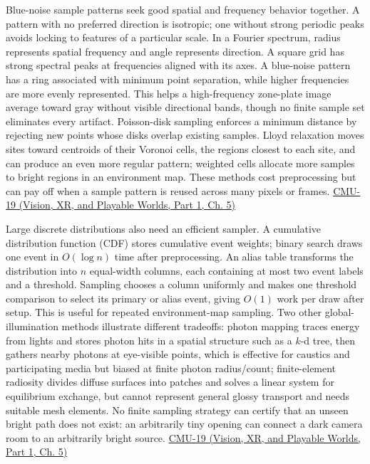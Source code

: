 Blue-noise sample patterns seek good spatial and frequency behavior together. A pattern with no preferred direction is isotropic; one without strong periodic peaks avoids locking to features of a particular scale. In a Fourier spectrum, radius represents spatial frequency and angle represents direction. A square grid has strong spectral peaks at frequencies aligned with its axes. A blue-noise pattern has a ring associated with minimum point separation, while higher frequencies are more evenly represented. This helps a high-frequency zone-plate image average toward gray without visible directional bands, though no finite sample set eliminates every artifact. Poisson-disk sampling enforces a minimum distance by rejecting new points whose disks overlap existing samples. Lloyd relaxation moves sites toward centroids of their Voronoi cells, the regions closest to each site, and can produce an even more regular pattern; weighted cells allocate more samples to bright regions in an environment map. These methods cost preprocessing but can pay off when a sample pattern is reused across many pixels or frames. \href{../07-Vision-XR-and-Playable-Worlds-P01/main.pdf\#04-visual-computing-ii-ch036-cmu-19---variance-reduction}{CMU-19 (Vision, XR, and Playable Worlds, Part 1, Ch. 5)}

Large discrete distributions also need an efficient sampler. A cumulative distribution function (CDF) stores cumulative event weights; binary search draws one event in \(O(\log n)\) time after preprocessing. An alias table transforms the distribution into \(n\) equal-width columns, each containing at most two event labels and a threshold. Sampling chooses a column uniformly and makes one threshold comparison to select its primary or alias event, giving \(O(1)\) work per draw after setup. This is useful for repeated environment-map sampling. Two other global-illumination methods illustrate different tradeoffs: photon mapping traces energy from lights and stores photon hits in a spatial structure such as a \(k\)-d tree, then gathers nearby photons at eye-visible points, which is effective for caustics and participating media but biased at finite photon radius/count; finite-element radiosity divides diffuse surfaces into patches and solves a linear system for equilibrium exchange, but cannot represent general glossy transport and needs suitable mesh elements. No finite sampling strategy can certify that an unseen bright path does not exist: an arbitrarily tiny opening can connect a dark camera room to an arbitrarily bright source. \href{../07-Vision-XR-and-Playable-Worlds-P01/main.pdf\#04-visual-computing-ii-ch036-cmu-19---variance-reduction}{CMU-19 (Vision, XR, and Playable Worlds, Part 1, Ch. 5)}

